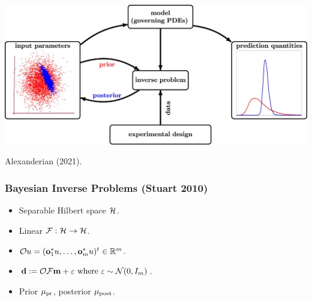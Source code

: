 \documentclass{beamer}
\begin{document}
\begin{frame}
  \begin{center}
    \includegraphics[width=\textwidth]{figs/bayesian_inverse_problems.jpg}
  \end{center}
  {\hfill \tiny Alexanderian (2021).}
\end{frame}

\begin{frame}
\frametitle{Bayesian Inverse Problems (Stuart 2010)}
\begin{itemize}
\item Separable Hilbert space $\mathcal{H}$.
\item Linear \(\mathcal{F}: \mathcal{H} \to \mathcal{H}\). 
\item \(\mathcal{O} u = (\mathbf{o}_1^*u, \dots, \mathbf{o}_m^*u )^t \in \mathbb{R}^m\).
\item \(\mathbf{d} := \mathcal{O} \mathcal{F} \mathbf{m} + \varepsilon \text{ where } \varepsilon \sim \mathcal{N}(0,I_m)\).
\item Prior $\mu_{\textup{pr}}$, posterior $\mu_{\textup{post}}$.
\end{itemize}

\end{frame}
\end{document}
